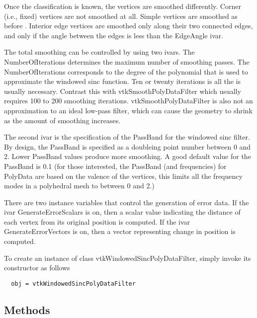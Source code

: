  Once the classification is known, the vertices are smoothed
 differently. Corner (i.e., fixed) vertices are not smoothed at all. 
 Simple vertices are smoothed as before . Interior edge vertices are
 smoothed only along their two connected edges, and only if the angle
 between the edges is less than the EdgeAngle ivar.

 The total smoothing can be controlled by using two ivars. The 
 NumberOfIterations determines the maximum number of smoothing passes.
 The NumberOfIterations corresponds to the degree of the polynomial that
 is used to approximate the windowed sinc function. Ten or twenty
 iterations is all the is usually necessary. Contrast this with
 vtkSmoothPolyDataFilter which usually requires 100 to 200 smoothing
 iterations. vtkSmoothPolyDataFilter is also not an approximation to
 an ideal low-pass filter, which can cause the geometry to shrink as the
 amount of smoothing increases.

 The second ivar is the specification of the PassBand for the windowed
 sinc filter.  By design, the PassBand is specified as a doubleing point
 number between 0 and 2.  Lower PassBand values produce more smoothing.
 A good default value for the PassBand is 0.1 (for those interested, the
 PassBand (and frequencies) for PolyData are based on the valence of the
 vertices, this limits all the frequency modes in a polyhedral mesh to
 between 0 and 2.)

 There are two instance variables that control the generation of error
 data. If the ivar GenerateErrorScalars is on, then a scalar value indicating
 the distance of each vertex from its original position is computed. If the
 ivar GenerateErrorVectors is on, then a vector representing change in 
 position is computed.


To create an instance of class vtkWindowedSincPolyDataFilter, simply
invoke its constructor as follows
\begin{verbatim}
  obj = vtkWindowedSincPolyDataFilter
\end{verbatim}
\subsection{Methods}

